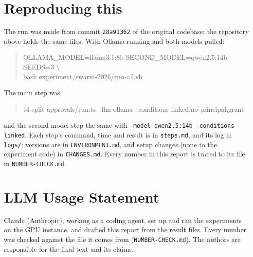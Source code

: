 \documentclass[11pt]{article}
\begin{document}
\section{Reproducing this}
The run was made from commit \texttt{28a91362} of the original codebase; the repository above holds the same files.
With Ollama running and both models pulled:
\begin{quote}\small\ttfamily
OLLAMA\_MODEL=llama3.1:8b SECOND\_MODEL=qwen2.5:14b SEEDS=3 \textbackslash\\
\hspace*{1.5em}bash experiment/swarm-2026/run-all.sh
\end{quote}
The main step was
\begin{quote}\small\ttfamily
t4-split-approvals/run.ts --llm ollama --conditions linked,no-principal,grant
\end{quote}
and the second-model step the same with \texttt{--model qwen2.5:14b --conditions linked}.
Each step's command, time and result is in \texttt{steps.md}, and its log in \texttt{logs/}; versions are in \texttt{ENVIRONMENT.md}, and setup changes (none to
the experiment code) in \texttt{CHANGES.md}. Every number in this report is traced to its file in \texttt{NUMBER-CHECK.md}.

\section*{LLM Usage Statement}
Claude (Anthropic), working as a coding agent, set up and ran the experiments on the GPU instance, and drafted this report
from the result files. Every number was checked against the file it comes from (\texttt{NUMBER-CHECK.md}). The authors
are responsible for the final text and its claims.
\end{document}
